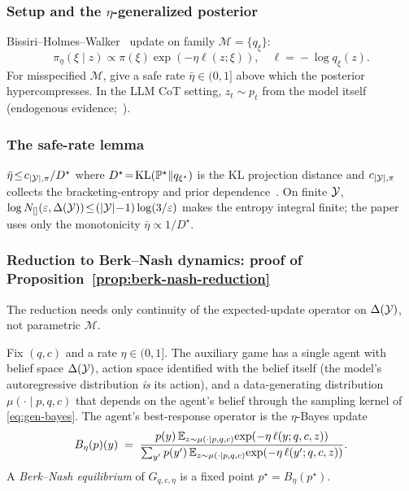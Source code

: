 \subsubsection{Setup and the $\eta$-generalized posterior}
\label{app:thm3-setup}

Bissiri--Holmes--Walker~\citep{bissiri2016} update on family
$\mathcal{M}\!=\!\{q_\xi\}$:
\begin{equation}
\pi_\eta(\xi\!\mid\!z)\!\propto\!\pi(\xi)\exp(-\eta\ell(z;\xi)),\quad
\ell\!=\!-\log q_\xi(z).
\label{eq:gen-bayes-app}
\end{equation}
For misspecified $\mathcal{M}$, \citet{grunwald2017} give a safe
rate $\bar\eta\!\in\!(0,1]$ above which the posterior
hypercompresses.  In the LLM CoT setting, $z_t\!\sim\!p_t$ from
the model itself (endogenous evidence;~\citealp{esponda2016,fudenberg2021}).

\subsubsection{The safe-rate lemma}
\label{app:thm3-shrinks}

\begin{lemma}
\label{lem:eta-bar-monotone}
$\bar\eta\!\le\!c_{|\mathcal{Y}|,\pi}/D^\star$ where
$D^\star\!=\!\operatorname{KL}(\mathbb{P}^\star\|q_{\xi^\star})$ is the KL projection
distance and $c_{|\mathcal{Y}|,\pi}$ collects the bracketing-entropy and
prior dependence~\citep[Thm.~1.6]{grunwald2017}.  On finite $\mathcal{Y}$,
$\log N_{[]}(\varepsilon,\Delta(\mathcal{Y}))\!\le\!(|\mathcal{Y}|\!-\!1)\log(3/\varepsilon)$
makes the entropy integral finite; the paper uses only the
monotonicity $\bar\eta\!\propto\!1/D^\star$.
\label{app:thm3-shrinks-explicit}
\end{lemma}

\subsubsection{Reduction to Berk--Nash dynamics: proof of Proposition~\ref{prop:berk-nash-reduction}}
\label{app:berk-nash-reduction}

The reduction needs only continuity of the expected-update operator
on $\Delta(\mathcal{Y})$, not parametric $\mathcal{M}$.

\begin{definition}
\label{def:bn-game}
Fix $(q,c)$ and a rate $\eta\in(0,1]$.  The auxiliary game has a
single agent with belief space $\Delta(\mathcal{Y})$, action space identified
with the belief itself (the model's autoregressive distribution
\emph{is} its action), and a data-generating distribution
$\mu(\cdot\mid p,q,c)$ that depends on the agent's belief through
the sampling kernel of \eqref{eq:gen-bayes}.  The agent's
best-response operator is the $\eta$-Bayes update
\[
B_\eta(p)(y)\;=\;\frac{p(y)\,\mathbb{E}_{z\sim\mu(\cdot\mid p,q,c)}\!\exp(-\eta\,\ell(y;q,c,z))}
{\sum_{y'} p(y')\,\mathbb{E}_{z\sim\mu(\cdot\mid p,q,c)}\!\exp(-\eta\,\ell(y';q,c,z))}.
\]
A \emph{Berk--Nash equilibrium} of $G_{q,c,\eta}$ is a fixed point
$p^\star=B_\eta(p^\star)$.
\end{definition}

